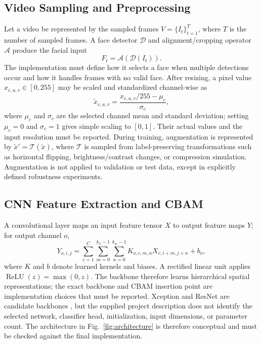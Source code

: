 \subsection{Video Sampling and Preprocessing}
Let a video be represented by the sampled frames $V=\{I_t\}_{t=1}^{T}$, where $T$ is the number of sampled frames. A face detector $\mathcal{D}$ and alignment/cropping operator $\mathcal{A}$ produce the facial input
\begin{equation}
    F_t=\mathcal{A}(\mathcal{D}(I_t)).
    \label{eq:face-preprocessing}
\end{equation}
The implementation must define how it selects a face when multiple detections occur and how it handles frames with no valid face. After resizing, a pixel value $x_{c,u,v}\in[0,255]$ may be scaled and standardized channel-wise as
\begin{equation}
    \tilde{x}_{c,u,v}=\frac{x_{c,u,v}/255-\mu_c}{\sigma_c},
    \label{eq:normalization}
\end{equation}
where $\mu_c$ and $\sigma_c$ are the selected channel mean and standard deviation; setting $\mu_c=0$ and $\sigma_c=1$ gives simple scaling to $[0,1]$. Their actual values and the input resolution must be reported. During training, augmentation is represented by $\tilde{x}'=\mathcal{T}(\tilde{x})$, where $\mathcal{T}$ is sampled from label-preserving transformations such as horizontal flipping, brightness/contrast changes, or compression simulation. Augmentation is not applied to validation or test data, except in explicitly defined robustness experiments.

\subsection{CNN Feature Extraction and CBAM}
A convolutional layer maps an input feature tensor $X$ to output feature maps $Y$; for output channel $o$,
\begin{equation}
    Y_{o,i,j}=\sum_{c=1}^{C}\sum_{m=0}^{k_h-1}\sum_{n=0}^{k_w-1}
    K_{o,c,m,n}X_{c,i+m,j+n}+b_o,
    \label{eq:convolution}
\end{equation}
where $K$ and $b$ denote learned kernels and biases. A rectified linear unit applies $\operatorname{ReLU}(z)=\max(0,z)$. The backbone therefore learns hierarchical spatial representations; the exact backbone and CBAM insertion point are implementation choices that must be reported. Xception and ResNet are candidate backbones \cite{chollet2017xception,he2016deep}, but the supplied project description does not identify the selected network, classifier head, initialization, input dimensions, or parameter count. The architecture in Fig.~\ref{fig:architecture} is therefore conceptual and must be checked against the final implementation.

